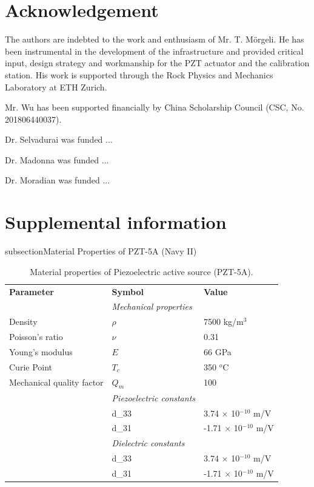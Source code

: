 \documentclass[preprint,3p, 11pt,authoryear]{elsarticle}
\begin{document}
\section*{Acknowledgement}
The authors are indebted to the work and enthusiasm of Mr. T. M\"orgeli. He has been instrumental in the development of the infrastructure and provided critical input, design strategy and workmanship for the PZT actuator and the calibration station. His work is supported through the Rock Physics and Mechanics Laboratory at ETH Zurich.

Mr. Wu has been supported financially by China Scholarship Council (CSC, No. 201806440037). 

Dr. Selvadurai was funded ... 

Dr. Madonna was funded ...

Dr. Moradian was funded ...
 



\clearpage
\section*{Supplemental information}

\*subsection{Material Properties of PZT-5A (Navy II) }
\begin{table}[ht]
	\centering
	\caption{Material properties of Piezoelectric active source (PZT-5A).}
	\begin{tabular}{ m{5cm} m{2cm} m{4cm}} 
		\hline  
		\bf{Parameter} 		      & \bf{Symbol} 	  & \bf{Value}	\\
	   & \textit{Mechanical properties} & \\
	    Density                   & $\rho$            & 7500 kg/m$^{3}$\\
	    Poisson's ratio           & $\nu$             & 0.31\\
	    Young's modulus           & $E$               & 66 GPa\\
        Curie Point               & $T_{c}$           & 350 $^{o}$C\\  
        Mechanical quality factor &   $Q_{m}$         & 100\\
	  & \textit{Piezoelectric constants} & \\
 	  & d_{33}                   & 3.74 $\times$ 10$^{-10}$ m/V\\
 	  & d_{31}                   & -1.71 $\times$ 10$^{-10}$ m/V\\
	  & \textit{Dielectric constants} & \\
 	  & d_{33}                   & 3.74 $\times$ 10$^{-10}$ m/V\\
 	  & d_{31}                   & -1.71 $\times$ 10$^{-10}$ m/V\\

	       
		\hline  	
	\end{tabular}
	\label{table1}
\end{table}
\end{document}
